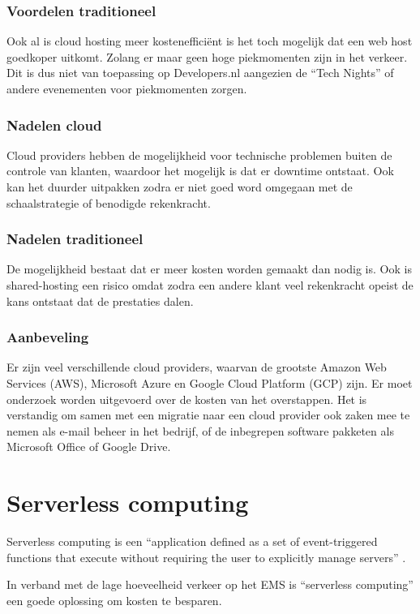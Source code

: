 \subsubsection{Voordelen traditioneel} 
Ook al is cloud hosting meer kostenefficiënt is het toch mogelijk dat een web host goedkoper uitkomt. Zolang er maar geen hoge piekmomenten zijn in het verkeer. Dit is dus niet van toepassing op Developers.nl aangezien de \enquote{Tech Nights} of andere evenementen voor piekmomenten zorgen. 

\subsubsection{Nadelen cloud}
Cloud providers hebben de mogelijkheid voor technische problemen buiten de controle van klanten, waardoor het mogelijk is dat er downtime ontstaat. Ook kan het duurder uitpakken zodra er niet goed word omgegaan met de schaalstrategie of benodigde rekenkracht.

\subsubsection{Nadelen traditioneel}
De mogelijkheid bestaat dat er meer kosten worden gemaakt dan nodig is. Ook is shared-hosting een risico omdat zodra een andere klant veel rekenkracht opeist de kans ontstaat dat de prestaties dalen.

\subsubsection{Aanbeveling}
Er zijn veel verschillende cloud providers, waarvan de grootste Amazon Web Services (AWS), Microsoft Azure en Google Cloud Platform (GCP) zijn. Er moet onderzoek worden uitgevoerd over de kosten van het overstappen. Het is verstandig om samen met een migratie naar een cloud provider ook zaken mee te nemen als e-mail beheer in het bedrijf, of de inbegrepen software pakketen als Microsoft Office of Google Drive.

\section{Serverless computing}
Serverless computing is een \enquote{application defined as a set of event-triggered functions that execute without requiring the user to explicitly manage servers} \parencite{ServerlessComputing}.

In verband met de lage hoeveelheid verkeer op het EMS is \enquote{serverless computing} een goede oplossing om kosten te besparen.

